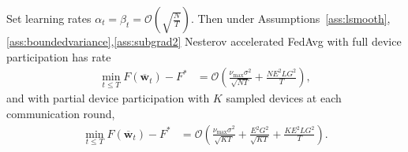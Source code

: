 

\begin{thm}
	Set learning rates $\alpha_{t}=\beta_{t}=\mathcal{O}(\sqrt{\frac{N}{T}})$. Then under Assumptions~\ref{ass:lsmooth},\ref{ass:boundedvariance},\ref{ass:subgrad2} Nesterov accelerated FedAvg with
	full device participation has rate
	\begin{align*}
	\min_{t\leq T}F(\overline{\mathbf{w}}_{t})-F^{\ast} & =\mathcal{O}\left(\frac{\nu_{\max}\sigma^{2}}{\sqrt{NT}}+\frac{NE^{2}LG^{2}}{T}\right),
	\end{align*}
	and with partial device participation with $K$ sampled devices at
	each communication round, 
	\begin{align*}
	\min_{t\leq T}F(\overline{\mathbf{w}}_{t})-F^{\ast} & =\mathcal{O}\left(\frac{\nu_{\max}\sigma^{2}}{\sqrt{KT}}+\frac{E^{2}G^{2}}{\sqrt{KT}}+\frac{KE^{2}LG^{2}}{T}\right).
	\end{align*}
\end{thm}

